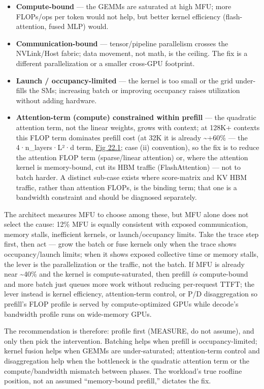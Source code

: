 \begin{itemize}
\tightlist
\item
  \textbf{Compute-bound} --- the GEMMs are saturated at high MFU; more
  FLOPs/ops per token would not help, but better kernel efficiency
  (flash-attention, fused MLP) would.
\item
  \textbf{Communication-bound} --- tensor/pipeline parallelism crosses
  the NVLink/Host fabric; data movement, not math, is the ceiling. The
  fix is a different parallelization or a smaller cross-GPU footprint.
\item
  \textbf{Launch / occupancy-limited} --- the kernel is too small or the
  grid under-fills the SMs; increasing batch or improving occupancy
  raises utilization without adding hardware.
\item
  \textbf{Attention-term (compute) constrained within prefill} --- the
  quadratic attention term, not the linear weights, grows with context;
  at 128K+ contexts this FLOP term dominates prefill cost (at 32K it is
  already \textasciitilde+60\% --- the 4·n\_layers·L²·d term, \hyperref[fig:22.1]{Fig 22.1};
  case (ii) convention), so the fix is to reduce the attention FLOP term
  (sparse/linear attention) or, where the attention kernel is
  memory-bound, cut its HBM traffic (FlashAttention) --- not to batch
  harder. A distinct sub-case exists where score-matrix and KV HBM
  traffic, rather than attention FLOPs, is the binding term; that one is
  a bandwidth constraint and should be diagnosed separately.
\end{itemize}

The architect measures MFU to choose among these, but MFU alone does not
select the cause: 12\% MFU is equally consistent with exposed
communication, memory stalls, inefficient kernels, or launch/occupancy
limits. Take the trace step first, then act --- grow the batch or fuse
kernels only when the trace shows occupancy/launch limits; when it shows
exposed collective time or memory stalls, the lever is the
parallelization or the traffic, not the batch. If MFU is already near
\textasciitilde40\% and the kernel is compute-saturated, then prefill
\emph{is} compute-bound and more batch just queues more work without
reducing per-request TTFT; the lever instead is kernel efficiency,
attention-term control, or P/D disaggregation so prefill's FLOP profile
is served by compute-optimized GPUs while decode's bandwidth profile
runs on wide-memory GPUs.

The recommendation is therefore: profile first (MEASURE, do not assume),
and only then pick the intervention. Batching helps when prefill is
occupancy-limited; kernel fusion helps when GEMMs are under-saturated;
attention-term control and disaggregation help when the bottleneck is
the quadratic attention term or the compute/bandwidth mismatch between
phases. The workload's true roofline position, not an assumed
``memory-bound prefill,'' dictates the fix.

